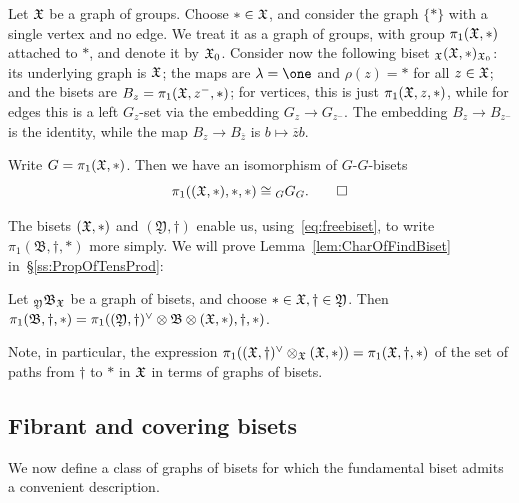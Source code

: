 \documentclass{amsart}
\begin{document}
Let ${\mathfrak X}$ be a graph of groups. Choose $*\in{\mathfrak X}$, and consider the graph
$\{*\}$ with a single vertex and no edge. We treat it as a graph of groups,
with group $\pi_1({\mathfrak X},*)$ attached to $*$, and denote it by
${\mathfrak X}_0$. Consider now the following biset ${}_{\mathfrak X}({\mathfrak X},*)_{{\mathfrak X}_0}$: its
underlying graph is ${\mathfrak X}$; the maps are $\lambda=\one$ and $\rho(z)=*$ for
all $z\in{\mathfrak X}$; and the bisets are $B_z=\pi_1({\mathfrak X},z^-,*)$; for vertices,
this is just $\pi_1({\mathfrak X},z,*)$, while for edges this is a left $G_z$-set via
the embedding $G_z\to G_{z^-}$. The embedding $B_z\to B_{z^-}$ is the
identity, while the map $B_z\to B_{\overline z}$ is $b\mapsto \overline
z b$.
\begin{lem}\pushQED{\qed}
  Write $G=\pi_1({\mathfrak X},*)$. Then we have an isomorphism of
  $G$-$G$-bisets
  \[\pi_1(({\mathfrak X},*),*,*)\cong {}_G G_G.\qedhere\]
\end{lem}

The bisets $({\mathfrak X},*)$ and $(\mathfrak Y,\dagger)$ enable us,
using~\eqref{eq:freebiset}, to write $\pi_1(\mathfrak B,\dagger,*)$ more
simply. We will prove Lemma~\ref{lem:CharOfFindBiset}
in~\S\ref{ss:PropOfTensProd}:
\begin{lem}\label{lem:CharOfFindBiset}
  Let ${}_{\mathfrak Y}\mathfrak B_{\mathfrak X}$ be a graph of bisets, and
  choose $*\in{\mathfrak X},\dagger\in\mathfrak Y$. Then $\pi_1(\mathfrak
  B,\dagger,*)=\pi_1((\mathfrak Y,\dagger)^\vee\otimes\mathfrak B\otimes({\mathfrak X},*),\dagger,*)$.
\end{lem}
\noindent Note, in particular, the expression
$\pi_1(({\mathfrak X},\dagger)^\vee\otimes_{\mathfrak X}({\mathfrak X},*))=\pi_1({\mathfrak X},\dagger,*)$ of the
set of paths from $\dagger$ to $*$ in ${\mathfrak X}$ in terms of graphs of bisets.

\subsection{Fibrant and covering bisets}
We now define a class of graphs of bisets for which the fundamental biset
admits a convenient description.
\end{document}
